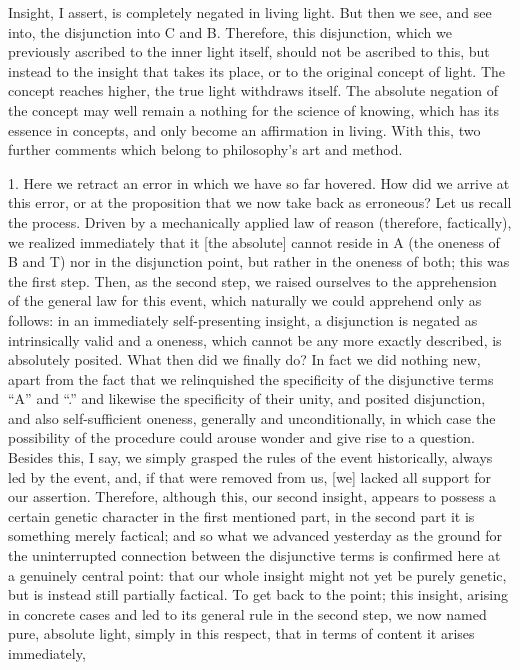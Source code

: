 Insight, I assert, is completely negated in living light.
But then we see, and see into, the disjunction into C and B.
Therefore, this disjunction, which we previously ascribed
to the inner light itself,
should not be ascribed to this,
but instead to the insight that takes its place,
or to the original concept of light.
The concept reaches higher,
the true light withdraws itself.
The absolute negation of the concept may well
remain a nothing for the science of knowing,
which has its essence in concepts,
and only become an affirmation in living.
With this, two further comments which belong
to philosophy’s art and method.

1. Here we retract an error in which we have so far hovered.
How did we arrive at this error,
or at the proposition that
we now take back as erroneous?
Let us recall the process.
Driven by a mechanically applied law of reason
(therefore, factically),
we realized immediately that it [the absolute]
cannot reside in A (the oneness of B and T)
nor in the disjunction point,
but rather in the oneness of both;
this was the first step.
Then, as the second step,
we raised ourselves to the apprehension
of the general law for this event,
which naturally we could apprehend only as follows:
in an immediately self-presenting insight,
a disjunction is negated as intrinsically valid
and a oneness, which cannot be any more exactly described,
is absolutely posited.
What then did we finally do?
In fact we did nothing new,
apart from the fact that we relinquished
the specificity of the disjunctive terms “A” and “.”
and likewise the specificity of their unity,
and posited disjunction,
and also self-sufficient oneness,
generally and unconditionally,
in which case the possibility of the procedure
could arouse wonder and give rise to a question.
Besides this, I say, we simply grasped
the rules of the event historically,
always led by the event,
and, if that were removed from us,
[we] lacked all support for our assertion.
Therefore, although this, our second insight,
appears to possess a certain genetic character
in the first mentioned part,
in the second part it is something merely factical;
and so what we advanced yesterday as the
ground for the uninterrupted connection
between the disjunctive terms is
confirmed here at a genuinely central point:
that our whole insight might not yet be purely genetic,
but is instead still partially factical.
To get back to the point;
this insight, arising in concrete cases
and led to its general rule in the second step,
we now named pure, absolute light,
simply in this respect,
that in terms of content it arises immediately,
